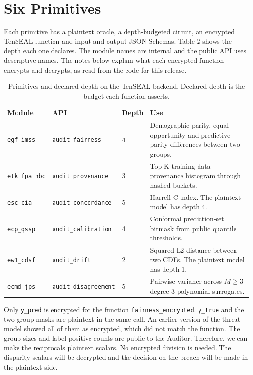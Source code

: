 \documentclass[10pt,a4paper]{article}
\begin{document}
\section{Six Primitives}

Each primitive has a plaintext oracle, a depth-budgeted circuit, an encrypted TenSEAL function and input and output JSON Schemas. Table 2 shows the depth each one declares. The module names are internal and the public API uses descriptive names. The notes below explain what each encrypted function encrypts and decrypts, as read from the code for this release.

\begin{table}[h]
\small
\caption{Primitives and declared depth on the TenSEAL backend. Declared depth is the budget each function asserts.}
\begin{tabularx}{\textwidth}{l l l Y}
\toprule
\textbf{Module} & \textbf{API} & \textbf{Depth} & \textbf{Use} \\
\midrule
\texttt{egf\_imss}    & \texttt{audit\_fairness}     & 4 & Demographic parity, equal opportunity and predictive parity differences between two groups. \\
\texttt{etk\_fpa\_hbc}& \texttt{audit\_provenance}   & 3 & Top-K training-data provenance histogram through hashed buckets. \\
\texttt{esc\_cia}     & \texttt{audit\_concordance}  & 5 & Harrell C-index. The plaintext model has depth 4. \\
\texttt{ecp\_qssp}    & \texttt{audit\_calibration}  & 4 & Conformal prediction-set bitmask from public quantile thresholds. \\
\texttt{ew1\_cdsf}    & \texttt{audit\_drift}        & 2 & Squared L2 distance between two CDFs. The plaintext model has depth 1. \\
\texttt{ecmd\_jps}    & \texttt{audit\_disagreement} & 5 & Pairwise variance across $M \geq 3$ degree-3 polynomial surrogates. \\
\bottomrule
\end{tabularx}
\end{table}

Only \texttt{y\_pred} is encrypted for the function \texttt{fairness\_encrypted}. \texttt{y\_true} and the two group masks are plaintext in the same call. An earlier version of the threat model showed all of them as encrypted, which did not match the function. The group sizes and label-positive counts are public to the Auditor. Therefore, we can make the reciprocals plaintext scalars. No encrypted division is needed. The disparity scalars will be decrypted and the decision on the breach will be made in the plaintext side.
\end{document}
